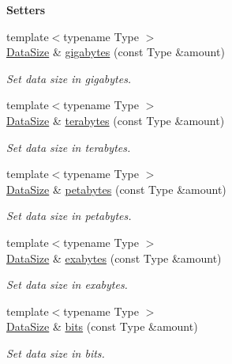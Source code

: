 \begin{Indent}{\bf Setters}
\begin{DoxyCompactItemize}
{\footnotesize template$<$typename Type $>$ }\\\hyperlink{exceptionmagrathea_1_1DataSize}{Data\-Size} \& \hyperlink{exceptionmagrathea_1_1DataSize_a3fbec8a42050dae7e9020ad0e3c4aa95}{gigabytes} (const Type \&amount)
\begin{DoxyCompactList}\small\item\em Set data size in gigabytes. \end{DoxyCompactList}\item 
{\footnotesize template$<$typename Type $>$ }\\\hyperlink{exceptionmagrathea_1_1DataSize}{Data\-Size} \& \hyperlink{exceptionmagrathea_1_1DataSize_a9ce9519d240e7db290b5b7e0f1ca0afb}{terabytes} (const Type \&amount)
\begin{DoxyCompactList}\small\item\em Set data size in terabytes. \end{DoxyCompactList}\item 
{\footnotesize template$<$typename Type $>$ }\\\hyperlink{exceptionmagrathea_1_1DataSize}{Data\-Size} \& \hyperlink{exceptionmagrathea_1_1DataSize_ac126cc0c013db8c39c886286b91ac6c3}{petabytes} (const Type \&amount)
\begin{DoxyCompactList}\small\item\em Set data size in petabytes. \end{DoxyCompactList}\item 
{\footnotesize template$<$typename Type $>$ }\\\hyperlink{exceptionmagrathea_1_1DataSize}{Data\-Size} \& \hyperlink{exceptionmagrathea_1_1DataSize_ab6d259868ed85d55d3da6c4e769ed915}{exabytes} (const Type \&amount)
\begin{DoxyCompactList}\small\item\em Set data size in exabytes. \end{DoxyCompactList}\item 
{\footnotesize template$<$typename Type $>$ }\\\hyperlink{exceptionmagrathea_1_1DataSize}{Data\-Size} \& \hyperlink{exceptionmagrathea_1_1DataSize_afb00905f0f8898e0461a04c086fc420a}{bits} (const Type \&amount)
\begin{DoxyCompactList}\small\item\em Set data size in bits. \end{DoxyCompactList}\end{DoxyCompactItemize}
\end{Indent}
